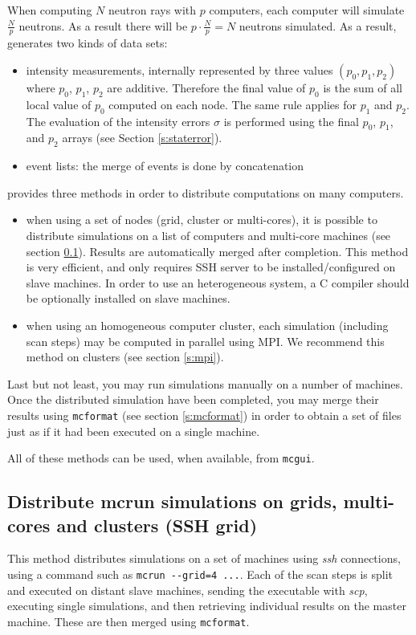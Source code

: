 When computing $N$ neutron rays with
$p$ computers, each computer will simulate $\frac{N}{p}$
neutrons. As a result there will be $p \cdot \frac{N}{p} = N$
neutrons simulated. As a result, \MCS generates two kinds of data sets:
\begin{itemize}
\item intensity measurements, internally represented by three
  values $(p_0, p_1, p_2)$ where $p_0$, $p_1$, $p_2$ are
  additive. Therefore the final value of $p_0$ is the sum of all
  local value of  $p_0$ computed on each node. The same rule applies
  for $p_1$ and $p_2$. The evaluation of the intensity errors $\sigma$
  is performed using the final $p_0$, $p_1$, and $p_2$ arrays (see Section \ref{s:staterror}).
\item event lists: the merge of events is done by concatenation
\end{itemize}

\MCS provides three methods in order to distribute computations on many computers.
\begin{itemize}
\item when using a set of nodes (grid, cluster or multi-cores), it is possible to distribute simulations on a 
  list of computers and multi-core machines (see section \ref{s:ssh-grid}). Results are automatically 
  merged after completion. 
  This method is very efficient, and only requires SSH server to be installed/configured on slave machines. 
  In order to use an heterogeneous system, a C compiler should be optionally installed on slave machines.
\item when using an homogeneous computer cluster, each simulation (including scan
  steps) may be computed in parallel using MPI. We recommend this method on clusters (see section \ref{s:mpi}).
\end{itemize}

Last but not least, you may run simulations manually on a number of machines.
Once the distributed simulation have been completed, you may merge their results using \verb+mcformat+ (see section \ref{s:mcformat})  in order to obtain a set of files just as if it had been executed on a single machine.

All of these methods can be used, when available, from \texttt{mcgui}.

\subsection{Distribute mcrun simulations on grids, multi-cores and clusters (SSH grid)}
\label{s:ssh-grid}
  This method distributes simulations on a set of machines using \emph{ssh}
  connections, using a command such as \verb+mcrun --grid=4 ...+. 
  Each of the scan steps is split and executed on distant slave machines, sending the executable
  with \emph{scp}, executing single simulations, and then retrieving individual
  results on the master machine. These are then merged using \texttt{mcformat}. 
  
